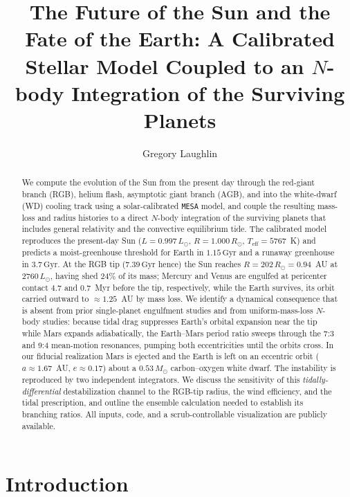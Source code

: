 \documentclass[twocolumn]{aastex631}
\newcommand{\msun}{M_\odot}
\newcommand{\rsun}{R_\odot}
\newcommand{\lsun}{L_\odot}
\newcommand{\teff}{T_{\mathrm{eff}}}
\newcommand{\gyr}{\,\mathrm{Gyr}}
\newcommand{\code}[1]{\texttt{#1}}
\begin{document}
\title{The Future of the Sun and the Fate of the Earth: A Calibrated Stellar
Model Coupled to an $N$-body Integration of the Surviving Planets}

\author{Gregory Laughlin}

\begin{abstract}
We compute the evolution of the Sun from the present day through the red-giant
branch (RGB), helium flash, asymptotic giant branch (AGB), and into the
white-dwarf (WD) cooling track using a solar-calibrated \code{MESA} model, and
couple the resulting mass-loss and radius histories to a direct $N$-body
integration of the surviving planets that includes general relativity and the
convective equilibrium tide. The calibrated model reproduces the present-day Sun
($L=0.997\,\lsun$, $R=1.000\,\rsun$, $\teff=5767$~K) and predicts a moist-greenhouse
threshold for Earth in $1.15\gyr$ and a runaway greenhouse in $3.7\gyr$. At the RGB
tip ($7.39\gyr$ hence) the Sun reaches $R=202\,\rsun=0.94$~AU at $2760\,\lsun$,
having shed $24\%$ of its mass; Mercury and Venus are engulfed at pericenter contact
$4.7$ and $0.7$~Myr before the tip, respectively, while the Earth survives, its
orbit carried outward to $\approx1.25$~AU by mass loss. We identify a dynamical
consequence that is absent from prior single-planet engulfment studies and from
uniform-mass-loss $N$-body studies: because tidal drag suppresses Earth's orbital
expansion near the tip while Mars expands adiabatically, the Earth--Mars period
ratio sweeps through the 7:3 and 9:4 mean-motion resonances, pumping both
eccentricities until the orbits cross. In our fiducial realization Mars is ejected
and the Earth is left on an eccentric orbit ($a\approx1.67$~AU, $e\approx0.17$)
about a $0.53\,\msun$ carbon--oxygen white dwarf. The instability is reproduced by
two independent integrators. We discuss the sensitivity of this
\emph{tidally-differential} destabilization channel to the RGB-tip radius, the wind
efficiency, and the tidal prescription, and outline the ensemble calculation needed
to establish its branching ratios. All inputs, code, and a scrub-controllable
visualization are publicly available.
\end{abstract}


\section{Introduction}
\end{document}
